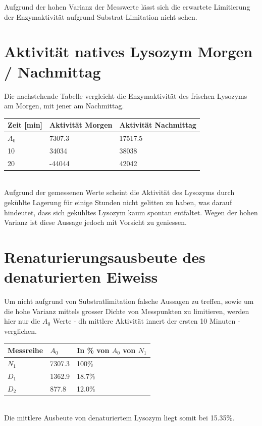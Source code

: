\documentclass[a4paper,german]{scrreprt}
\begin{document}
Aufgrund der hohen Varianz der Messwerte lässt sich die erwartete Limitierung
der Enzymaktivität aufgrund Substrat-Limitation nicht sehen.

\section{Aktivität natives Lysozym Morgen / Nachmittag}

Die nachstehende Tabelle vergleicht die Enzymaktivität des frischen Lysozyms am
Morgen, mit jener am Nachmittag.
\\

\begin{tabu}{|l|l|l|}
	\hline
	Zeit [min] & Aktivität Morgen & Aktivität Nachmittag \\
	\hline
	$A_0$ & 7307.3 & 17517.5 \\
	10 & 34034 & 38038 \\ 
	20 & -44044 & 42042 \\ 
	\hline
\end{tabu}
\\

Aufgrund der gemessenen Werte scheint die Aktivität des Lysozyms durch gekühlte
Lagerung für einige Stunden nicht gelitten zu haben, was darauf hindeutet, dass
sich gekühltes Lysozym kaum spontan entfaltet. Wegen der hohen Varianz ist
diese Aussage jedoch mit Vorsicht zu geniessen.

\section{Renaturierungsausbeute des denaturierten Eiweiss}

Um nicht aufgrund von Substratlimitation falsche Aussagen zu treffen, sowie um
die hohe Varianz mittels grosser Dichte von Messpunkten zu limitieren, werden
hier nur die $A_0$ Werte - dh mittlere Aktivität innert der ersten 10 Minuten -
verglichen.
\\

\begin{tabu}{|l|l|l|}
	\hline
	Messreihe & $A_0$ & In \% von $A_0$ von $N_1$ \\
	\hline
	$N_1$ & 7307.3 & 100\% \\
	$D_1$ & 1362.9 & 18.7\% \\
	$D_2$ & 877.8 & 12.0\% \\
	\hline
\end{tabu}
\\

Die mittlere Ausbeute von denaturiertem Lysozym liegt somit bei 15.35\%.
\end{document}
